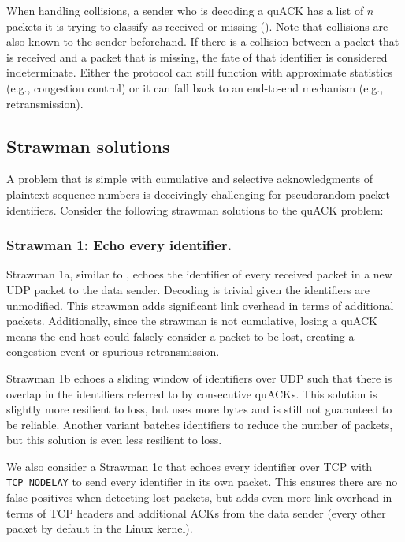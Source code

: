When handling collisions, a sender who is decoding a quACK has a list of $n$
packets it is trying to classify as received or missing
(). Note that collisions are also known to the
sender beforehand. If there is a collision between a packet that is received
and a packet that is missing, the fate of that identifier is considered
indeterminate. Either the protocol can still function with approximate
statistics (e.g., congestion control) or it can fall back to an end-to-end
mechanism (e.g., retransmission).

\subsection{Strawman solutions}
\label{sec:quack:problem:strawmen}




A problem that is simple with cumulative and selective acknowledgments of
plaintext sequence numbers is deceivingly challenging for pseudorandom
packet identifiers. Consider the following strawman solutions to the quACK
problem:

\subsubsection{Strawman 1: Echo every identifier.}
Strawman 1a, similar to \cite{li-tsvwg-loops-problem-opportunities-06,kramer2020lwpep},
echoes the identifier of every received packet in a new UDP packet to the data
sender.  Decoding is trivial given the identifiers are unmodified.
This strawman adds significant link overhead in terms of additional packets.
Additionally, since the strawman is not cumulative, losing a quACK means the
end host could falsely consider a packet to be lost, creating a congestion
event or spurious retransmission.

Strawman 1b echoes a sliding window of identifiers over UDP such that there is overlap
in the identifiers referred to by consecutive quACKs.
This solution is slightly more resilient to loss, but uses more bytes and is
still not guaranteed to be reliable.
Another variant batches identifiers to reduce the number of packets, but this
solution is even less resilient to loss.

We also consider a Strawman 1c that echoes every identifier over TCP with
\texttt{TCP\_NODELAY} to send every identifier in its own packet.
This ensures there are no false positives when detecting lost packets,
but adds even more link overhead in terms of TCP headers and additional ACKs
from the data sender (every other packet by default in the Linux kernel).

